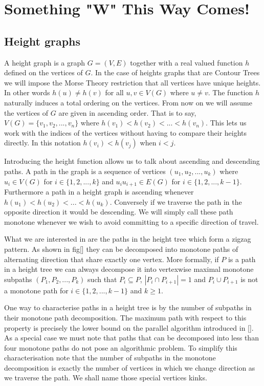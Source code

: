 \chapter{Something "W" This Way Comes!}
\label{chapter2}

\section{Height graphs}

A height graph is a graph $G = (V, E)$ together with a real valued function $h$ defined on the vertices of $G$. In the case of heights graphs that are Contour Trees we will impose the Morse Theory restriction that all vertices have unique heights. In other words $h(u) \ne h(v)$ for all $u ,v \in V(G)$ where $u \ne v$. The function $h$ naturally induces a total ordering on the vertices. From now on we will assume the vertices of $G$ are given in ascending order. That is to say, $V(G) = \{v_1, v_2, ... , v_n\}$ where $h(v_1) < h(v_2) < ... < h(v_n)$. This lets us work with the indices of the vertices without having to compare their heights directly. In this notation $h(v_i) < h(v_j)$ when $i < j$.


Introducing the height function allows us to talk about ascending and descending paths. A path in the graph is a sequence of vertices $(u_1, u_2, ... , u_k)$ where $u_i \in V(G)$ for $i \in \{1, 2, ..., k\}$ and $u_iu_{i+1} \in E(G)$ for $i \in \{1, 2, ..., k-1\}$. Furthermore a path in a height graph is ascending whenever $h(u_1) < h(u_2) < ... < h(u_k)$. Conversely if we traverse the path in the opposite direction it would be descending. We will simply call these path monotone whenever we wish to avoid committing to a specific direction of travel.

What we are interested in are the paths in the height tree which form a zigzag pattern. As shown in fig[] they can be decomposed into monotone paths of alternating direction that share exactly one vertex. More formally, if $P$ is a path in a height tree we can always decompose it into vertexwise maximal monotone subpaths $(P_1, P_2, ..., P_k)$ such that $P_i \subseteq P$, $|P_i \cap P_{i+1}| = 1$ and $P_i \cup P_{i+1}$ is not a monotone path for $i \in \{1, 2, ..., k-1\}$ and $k \ge 1$. 

One way to characterise paths in a height tree is by the number of subpaths in their monotone path decomposition. The maximum path with respect to this property is precisely the lower bound on the parallel algorithm introduced in []. As a special case we must note that paths that can be decomposed into less than four monotone paths do not pose an algorithmic problem. To simplify this characterisation note that the number of subpaths in the monotone decomposition is exactly the number of vertices in which we change direction as we traverse the path. We shall name those special vertices kinks.

